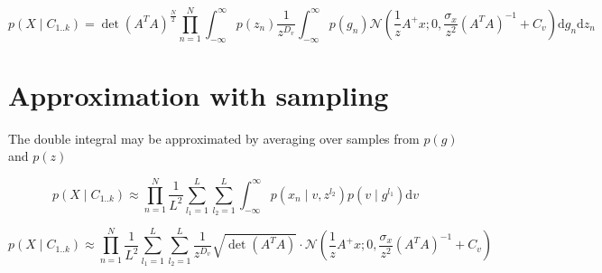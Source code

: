 \documentclass{paper}
\begin{document}
\begin{equation}
p(X \mid C_{1..k}) =  \det(A^T A)^{\frac{N}{2}} \prod_{n=1}^N \int_{-\infty}^{\infty} p(z_n) \frac{1}{z^{D_v}}  \int_{-\infty}^{\infty}  p(g_n) \mathcal{N}(\frac{1}{z} A^{+}x; 0,\frac{\sigma_x}{z^2} (A^T A)^{-1} +C_v) \mathrm{d}g_n \mathrm{d}z_n
\end{equation}

\section{Approximation with sampling}

The double integral may be approximated by averaging over samples from $p(g)$ and $p(z)$

\begin{equation}
p(X \mid C_{1..k}) \approx \prod_{n=1}^N \frac{1}{L^2} \sum_{l_1=1}^L \sum_{l_2=1}^L  \int_{-\infty}^{\infty} p(x_n \mid v,z^{l_2}) p(v \mid g^{l_1}) \mathrm{d}v
\end{equation}
% 
%
% 

\begin{equation}
p(X \mid C_{1..k}) \approx \prod_{n=1}^N \frac{1}{L^2} \sum_{l_1=1}^L \sum_{l_2=1}^L  \frac{1}{z^{D_v}} \sqrt{\det(A^T A)}  \cdot \mathcal{N}(\frac{1}{z} A^{+}x; 0,\frac{\sigma_x}{z^2} (A^T A)^{-1} +C_v)\end{equation}
\end{document}
